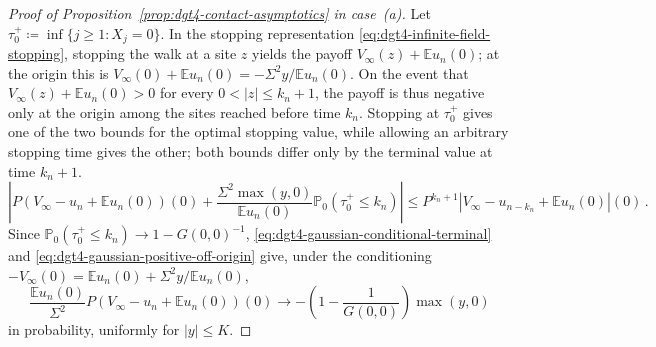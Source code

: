 \documentclass[11pt]{amsart}
\theoremstyle{plain}
\theoremstyle{definition}
\newcommand{\E}{\mathbb{E}}
\renewcommand{\P}{\mathbb{P}}
\begin{document}
\begin{proof}[Proof of Proposition~\ref{prop:dgt4-contact-asymptotics} in case~\textup{(a)}]
	Let $\tau_0^+\coloneqq\inf\{j\geq1:X_j=0\}$. In the stopping representation
	\eqref{eq:dgt4-infinite-field-stopping}, stopping the walk at a site $z$ yields the payoff $V_\infty(z)+\E u_n(0)$; at the origin this is
	$V_\infty(0)+\E u_n(0)=-\Sigma^2y/\E u_n(0)$. On the event that
	$V_\infty(z)+\E u_n(0)>0$ for every $0<|z|\leq k_n+1$, the payoff is thus negative only at the origin among the sites reached before time $k_n$. Stopping at $\tau_0^+$ gives one of the two bounds for the optimal stopping value, while allowing an arbitrary stopping time gives the other; both bounds differ only by the terminal value at time $k_n+1$.
	\begin{equation}\label{eq:dgt4-gaussian-stopping-comparison}
		\left|
		P(V_\infty-u_n+\E u_n(0))(0)
		+\frac{\Sigma^2\max(y,0)}{\E u_n(0)}
		\P_0(\tau_0^+\leq k_n)
		\right|
		\leq
		P^{k_n+1}|V_\infty-u_{n-k_n}+\E u_n(0)|(0)\, .
	\end{equation}
	Since $\P_0(\tau_0^+\leq k_n)\to1-G(0,0)^{-1}$, \eqref{eq:dgt4-gaussian-conditional-terminal} and
	\eqref{eq:dgt4-gaussian-positive-off-origin} give, under the conditioning
	$-V_\infty(0)=\E u_n(0)+\Sigma^2y/\E u_n(0)$,
	\begin{equation}\label{eq:dgt4-gaussian-boundary-profile}
		\frac{\E u_n(0)}{\Sigma^2}P(V_\infty-u_n+\E u_n(0))(0)\longrightarrow-\left(1-\frac1{G(0,0)}\right)\max(y,0)
	\end{equation}
	in probability, uniformly for $|y|\leq K$.


\end{proof}
\end{document}
